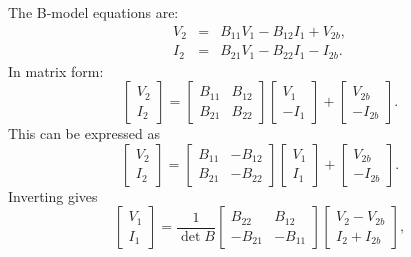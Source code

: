 \documentclass[a4paper, 12pt]{article}
\begin{document}
The B-model equations are:
%
\begin{eqnarray}
  V_2 & = & B_{11} V_1 - B_{12} I_1 + V_{2b}, \\
  I_2 & = & B_{21} V_1 - B_{22} I_1 - I_{2b}.
\end{eqnarray}
%
In matrix form:
%
\begin{equation}
  \begin{bmatrix}
    V_2 \\ I_2
  \end{bmatrix}
  =
  \begin{bmatrix}
    B_{11} & B_{12} \\
    B_{21} & B_{22}
  \end{bmatrix}
  \begin{bmatrix}
    V_1 \\ -I_1
  \end{bmatrix}  
  +
  \begin{bmatrix}
    V_{2b} \\ -I_{2b}
  \end{bmatrix}. 
\end{equation}
%
This can be expressed as
%
\begin{equation}
  \begin{bmatrix}
    V_2 \\ I_2
  \end{bmatrix}
  =
  \begin{bmatrix}
    B_{11} & -B_{12} \\
    B_{21} & -B_{22}
  \end{bmatrix}
  \begin{bmatrix}
    V_1 \\ I_1
  \end{bmatrix}  
  +
  \begin{bmatrix}
    V_{2b} \\ -I_{2b}
  \end{bmatrix}. 
\end{equation}
%
Inverting gives
%
\begin{equation}
  \begin{bmatrix}
    V_1 \\ I_1
  \end{bmatrix}
  =
  \frac{1}{\det{B}}
  \begin{bmatrix}
    B_{22} & B_{12} \\
    -B_{21} & -B_{11}
  \end{bmatrix}
  \begin{bmatrix}
    V_2 - V_{2b} \\ I_2 + I_{2b}
  \end{bmatrix},
\end{equation}
\end{document}
